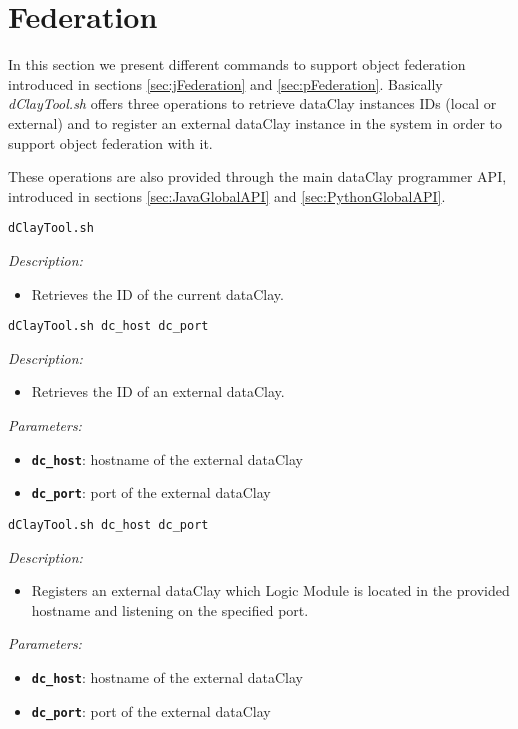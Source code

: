 \section{Federation}
\label{sec:dClayToolFederation}

In this section we present different commands to support object federation introduced in sections \ref{sec:jFederation} and \ref{sec:pFederation}.
Basically \textit{dClayTool.sh} offers three operations to retrieve dataClay instances IDs (local or external) and to register an external dataClay instance in the system in order to support object federation with it.

These operations are also provided through the main dataClay programmer API, introduced in sections \ref{sec:JavaGlobalAPI} and \ref{sec:PythonGlobalAPI}.

\begin{dBox}
\texttt{dClayTool.sh }
\LINE

{\it Description:}

\begin{itemize}
	\item Retrieves the ID of the current dataClay.
\end{itemize}

\end{dBox}

\begin{dBox}
\texttt{dClayTool.sh  dc\_host dc\_port}
\LINE

{\it Description:}

\begin{itemize}
	\item Retrieves the ID of an external dataClay.
\end{itemize}

{\it Parameters:}

\begin{itemize}
	\item \texttt{\bfseries dc\_host}: hostname of the external dataClay
	\item \texttt{\bfseries dc\_port}: port of the external dataClay
\end{itemize}

\end{dBox}

\begin{dBox}
\texttt{dClayTool.sh  dc\_host dc\_port}
\LINE

{\it Description:}

\begin{itemize}
	\item Registers an external dataClay which Logic Module is located in the provided hostname and listening on the specified port.
\end{itemize}

{\it Parameters:}

\begin{itemize}
	\item \texttt{\bfseries dc\_host}: hostname of the external dataClay
	\item \texttt{\bfseries dc\_port}: port of the external dataClay
\end{itemize}

\end{dBox}